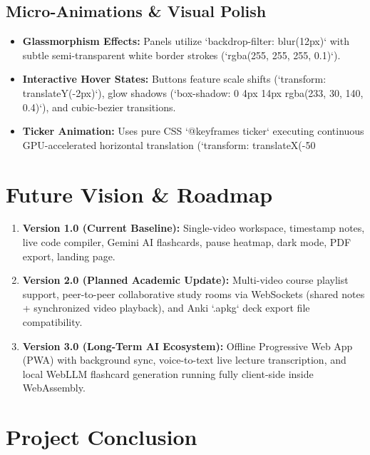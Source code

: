 \documentclass[12pt,a4paper]{article}
\begin{document}
\subsection{Micro-Animations \& Visual Polish}
\begin{itemize}[leftmargin=1.2cm]
    \item \textbf{Glassmorphism Effects:} Panels utilize `backdrop-filter: blur(12px)` with subtle semi-transparent white border strokes (`rgba(255, 255, 255, 0.1)`).
    \item \textbf{Interactive Hover States:} Buttons feature scale shifts (`transform: translateY(-2px)`), glow shadows (`box-shadow: 0 4px 14px rgba(233, 30, 140, 0.4)`), and cubic-bezier transitions.
    \item \textbf{Ticker Animation:} Uses pure CSS `@keyframes ticker` executing continuous GPU-accelerated horizontal translation (`transform: translateX(-50%
\end{itemize}

\section{Future Vision \& Roadmap}

\begin{enumerate}[leftmargin=1.2cm]
    \item \textbf{Version 1.0 (Current Baseline):} Single-video workspace, timestamp notes, live code compiler, Gemini AI flashcards, pause heatmap, dark mode, PDF export, landing page.
    \item \textbf{Version 2.0 (Planned Academic Update):} Multi-video course playlist support, peer-to-peer collaborative study rooms via WebSockets (shared notes + synchronized video playback), and Anki `.apkg` deck export file compatibility.
    \item \textbf{Version 3.0 (Long-Term AI Ecosystem):} Offline Progressive Web App (PWA) with background sync, voice-to-text live lecture transcription, and local WebLLM flashcard generation running fully client-side inside WebAssembly.
\end{enumerate}

\section{Project Conclusion}
\end{document}
